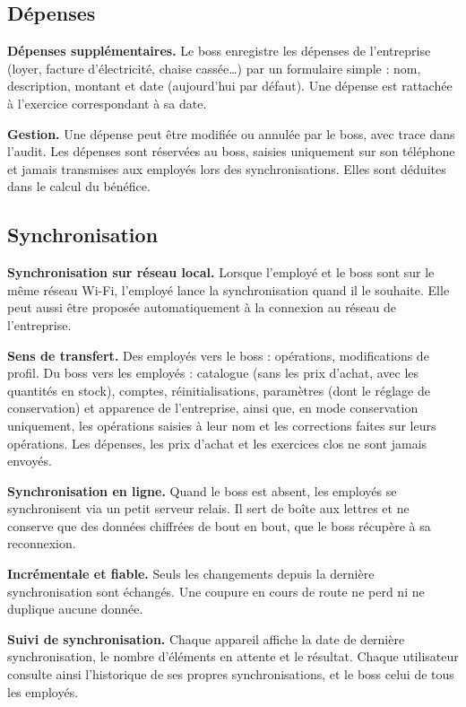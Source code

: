 \documentclass[11pt,a4paper]{article}
\newcommand{\fonc}[2]{\textbf{#1.} #2\par\vspace{0.2em}}
\begin{document}
	\subsection{Dépenses}
	
	\fonc{Dépenses supplémentaires}{Le boss enregistre les dépenses de l'entreprise (loyer, facture d'électricité, chaise cassée\dots) par un formulaire simple : nom, description, montant et date (aujourd'hui par défaut). Une dépense est rattachée à l'exercice correspondant à sa date.}
	
	\fonc{Gestion}{Une dépense peut être modifiée ou annulée par le boss, avec trace dans l'audit. Les dépenses sont réservées au boss, saisies uniquement sur son téléphone et jamais transmises aux employés lors des synchronisations. Elles sont déduites dans le calcul du bénéfice.}
	
	\subsection{Synchronisation}
	
	\fonc{Synchronisation sur réseau local}{Lorsque l'employé et le boss sont sur le même réseau Wi-Fi, l'employé lance la synchronisation quand il le souhaite. Elle peut aussi être proposée automatiquement à la connexion au réseau de l'entreprise.}
	
	\fonc{Sens de transfert}{Des employés vers le boss : opérations, modifications de profil. Du boss vers les employés : catalogue (sans les prix d'achat, avec les quantités en stock), comptes, réinitialisations, paramètres (dont le réglage de conservation) et apparence de l'entreprise, ainsi que, en mode conservation uniquement, les opérations saisies à leur nom et les corrections faites sur leurs opérations. Les dépenses, les prix d'achat et les exercices clos ne sont jamais envoyés.}
	
	\fonc{Synchronisation en ligne}{Quand le boss est absent, les employés se synchronisent via un petit serveur relais. Il sert de boîte aux lettres et ne conserve que des données chiffrées de bout en bout, que le boss récupère à sa reconnexion.}
	
	\fonc{Incrémentale et fiable}{Seuls les changements depuis la dernière synchronisation sont échangés. Une coupure en cours de route ne perd ni ne duplique aucune donnée.}
	
	\fonc{Suivi de synchronisation}{Chaque appareil affiche la date de dernière synchronisation, le nombre d'éléments en attente et le résultat. Chaque utilisateur consulte ainsi l'historique de ses propres synchronisations, et le boss celui de tous les employés.}
	
\end{document}
